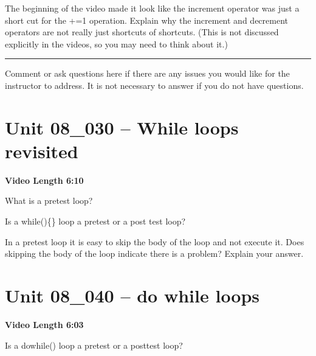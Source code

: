 \documentclass[letterpaper,12pt]{exam}
\newcommand{\unit}{Unit 08}
\begin{document}
\begin{questions}
\begin{samepage}
    \question The beginning of the video made it look like the increment operator was just a short cut for the +=1 operation.  Explain why the increment and decrement operators are not really just shortcuts of shortcuts.  (This is not discussed explicitly in the videos, so you may need to think about it.)
    \vspace{5mm}
\end{samepage}


\begin{samepage}
    \begin{center}
    \rule{0.8\textwidth}{.4pt}
    \end{center}
	\question Comment or ask questions here if there are any issues you would like for the instructor to address.  It is not necessary to answer if you do not have questions.
	\vspace{30mm}
\end{samepage}
\section*{\unit\_030 -- While loops revisited} %
\par{\selectfont\textbf{Video Length 6:10}}
\begin{samepage}
    \question What is a pretest loop?
    \vspace{5mm}
\end{samepage}

\begin{samepage}
    \question Is a while()\{\} loop a pretest or a post test loop?
    \vspace{5mm}
\end{samepage}
\begin{samepage}
    \question In a pretest loop it is easy to skip the body of the loop and not execute it.  Does skipping the body of the loop indicate there is a problem?  Explain your answer.
    \vspace{5mm}
\end{samepage}


\section*{\unit\_040 -- do while loops} 
\par{\selectfont\textbf{Video Length 6:03}}
\begin{samepage}
    \question Is a do{}while() loop a pretest or a posttest loop?
    \vspace{5mm}
\end{samepage}


\end{questions}
\end{document}
